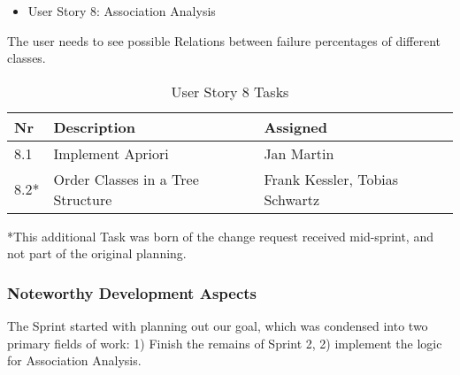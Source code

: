 \newpage
\begin{itemize}
	\item User Story 8: Association Analysis
	\end{itemize}
The user needs to see possible Relations between failure percentages of different classes.
\begin{table}[h]
  \caption{User Story 8 Tasks}
  \label{Story 8 Tasks}
  \centering
  \begin{tabular}{p{1cm}|p{5cm}|p{3cm}|}
  	Nr & Description & Assigned \\ 
  	\hline
  	8.1 & Implement Apriori & Jan Martin \\ 
  	\hline
  	8.2* & Order Classes in a Tree Structure & Frank Kessler, Tobias Schwartz \\ 
  	\hline
  \end{tabular}
\end{table}
*This additional Task was born of the change request received mid-sprint, and not part of the original planning.




\subsubsection*{Noteworthy Development Aspects}

The Sprint started with planning out our goal, which was condensed into two primary fields of work: 1) Finish the remains of Sprint 2, 2) implement the logic for Association Analysis. 


